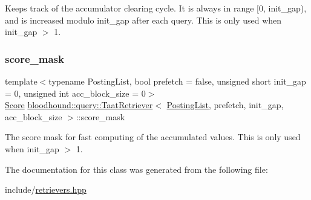 Keeps track of the accumulator clearing cycle. It is always in range \mbox{[}0, init\+\_\+gap), and is increased modulo init\+\_\+gap after each query. This is only used when init\+\_\+gap $>$ 1. \mbox{\label{classbloodhound_1_1query_1_1TaatRetriever_ac38b873ceff34b55bb8ac82800946825}} 
\subsubsection{\texorpdfstring{score\+\_\+mask}{score\_mask}}
{\footnotesize\ttfamily template$<$typename Posting\+List, bool prefetch = false, unsigned short init\+\_\+gap = 0, unsigned int acc\+\_\+block\+\_\+size = 0$>$ \\
\mbox{\hyperlink{structbloodhound_1_1Score}{Score}} \mbox{\hyperlink{classbloodhound_1_1query_1_1TaatRetriever}{bloodhound\+::query\+::\+Taat\+Retriever}}$<$ \mbox{\hyperlink{classbloodhound_1_1PostingList}{Posting\+List}}, prefetch, init\+\_\+gap, acc\+\_\+block\+\_\+size $>$\+::score\+\_\+mask\hspace{0.3cm}{\ttfamily [protected]}}

The score mask for fast computing of the accumulated values. This is only used when init\+\_\+gap $>$ 1. 

The documentation for this class was generated from the following file\+:\begin{DoxyCompactItemize}
\item 
include/\mbox{\hyperlink{retrievers_8hpp}{retrievers.\+hpp}}\end{DoxyCompactItemize}
